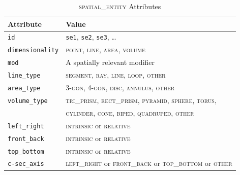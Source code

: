 \documentclass[11pt]{article}
\newenvironment{attributes}
{
\begin{tabular}{|l|l|}
    \hline \textbf{Attribute} & \textbf{Value}\\
}
{   \hline
\end{tabular}
}
\begin{document}
\begin{table}[h]
\centering
\begin{attributes}
    \hline \texttt{id}                  & \texttt{se1}, \texttt{se2}, 
                                          \texttt{se3}, \ldots\\
    \hline \texttt{dimensionality}      & \textsc{point}, \textsc{line}, 
                                          \textsc{area}, \textsc{volume}\\
    \hline \texttt{mod}                 & A spatially relevant modifier\\
    \hline \texttt{line\_type}          & \textsc{segment}, \textsc{ray}, 
                                          \textsc{line}, \textsc{loop}, 
                                          \textsc{other}\\
    \hline \texttt{area\_type}          & \textsc{3-gon}, \textsc{4-gon}, 
                                          \textsc{disc}, \textsc{annulus}, 
                                          \textsc{other}\\
    \hline \texttt{volume\_type}        & \textsc{tri\_prism}, 
                                          \textsc{rect\_prism}, 
                                          \textsc{pyramid}, \textsc{sphere}, 
                                          \textsc{torus},\\
                                        & \textsc{cylinder}, \textsc{cone}, 
                                          \textsc{biped}, \textsc{quadruped}, 
                                          \textsc{other}\\
    \hline \texttt{left\_right}         & \textsc{intrinsic} or 
                                          \textsc{relative}\\
    \hline \texttt{front\_back}         & \textsc{intrinsic} or 
                                          \textsc{relative}\\
    \hline \texttt{top\_bottom}         & \textsc{intrinsic} or 
                                          \textsc{relative}\\
    \hline \texttt{c-sec\_axis}         & \textsc{left\_right} or 
                                          \textsc{front\_back} or 
                                          \textsc{top\_bottom} or 
                                          \textsc{other}\\
\end{attributes}
\caption{\textsc{spatial\_entity} Attributes}
\label{tab:spatial_entity}
\end{table}
\end{document}
